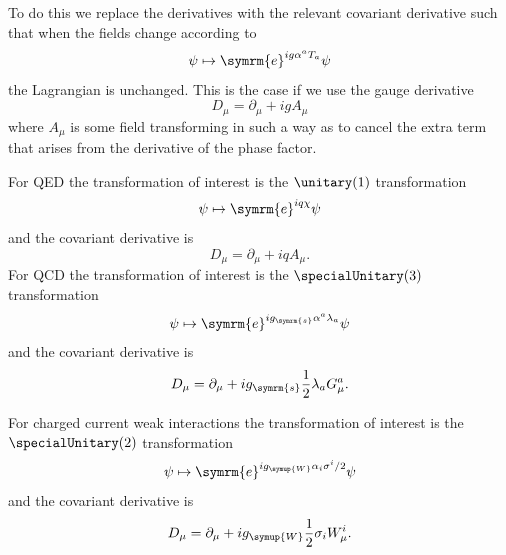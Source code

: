 \documentclass[fleqn]{NotesClass}
\newcommand{\Pparticle}[1]{\symup{#1}}
\newcommand{\PW}{\ensuremath{\Pparticle{W}}}
\newcommand{\strongCoupling}{g_{\symrm{s}}}
\newcommand{\e}{\symrm{e}}
\begin{document}
    To do this we replace the derivatives with the relevant covariant derivative such that when the fields change according to
    \begin{equation}
        \psi \mapsto \e^{i g \alpha^a T_a} \psi
    \end{equation}
    the Lagrangian is unchanged.
    This is the case if we use the gauge derivative 
    \begin{equation}
        D_\mu = \partial_\mu + igA_\mu
    \end{equation}
    where \(A_\mu\) is some field transforming in such a way as to cancel the extra term that arises from the derivative of the phase factor.
    
    For QED the transformation of interest is the \(\unitary(1)\) transformation
    \begin{equation}
        \psi \mapsto \e^{iq\chi}\psi
    \end{equation}
    and the covariant derivative is
    \begin{equation}
        D_\mu = \partial_\mu + iqA_\mu.
    \end{equation}
    For QCD the transformation of interest is the \(\specialUnitary(3)\) transformation
    \begin{equation}
        \psi \mapsto \e^{i\strongCoupling \alpha^a\lambda_a} \psi
    \end{equation}
    and the covariant derivative is
    \begin{equation}
        D_\mu = \partial_\mu + i\strongCoupling \frac{1}{2} \lambda_a G^a_\mu.
    \end{equation}
    
    For charged current weak interactions the transformation of interest is the \(\specialUnitary(2)\) transformation
    \begin{equation}
        \psi \mapsto \e^{ig_{\PW} \alpha_i\sigma^i/2}\psi
    \end{equation}
    and the covariant derivative is
    \begin{equation}
        D_\mu = \partial_\mu + ig_{\PW} \frac{1}{2}\sigma_i W^i_{\mu}.
    \end{equation}
    
\end{document}
